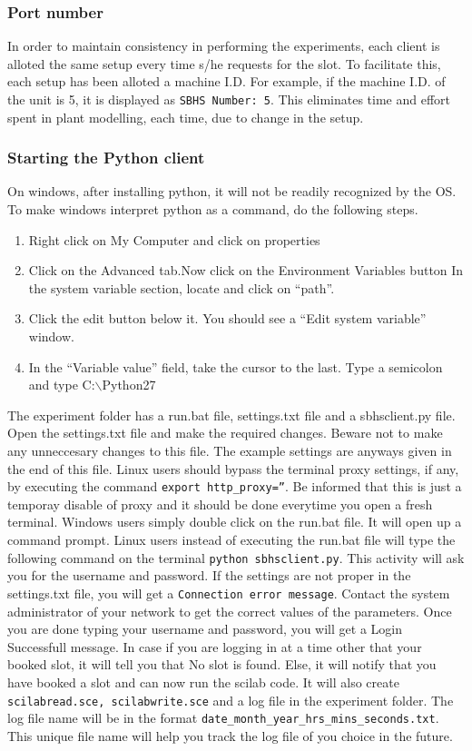 \subsubsection {Port number} In order to maintain consistency in
performing the experiments, each client is alloted the same setup
every time s/he requests for the slot. To facilitate this, each setup
has been alloted a machine I.D. For example, if the machine I.D. of
the unit is 5, it is displayed as {\tt SBHS Number: 5}. This
eliminates time and effort spent in plant modelling, each time, due to
change in the setup.

\subsubsection { Starting the Python client} On windows, after installing python, it will not be readily recognized by the OS. To make windows interpret python as a command, do the following steps.
\begin{enumerate}
\item Right click on My Computer and click on properties
\item Click on the Advanced tab.Now click on the Environment Variables button
In the system variable section, locate and click on “path”.
\item Click the edit button below it. You should see a “Edit system variable” window.
\item In the “Variable value” field, take the cursor to the last.
Type a semicolon and type C:$\backslash$Python27
\end{enumerate}
The experiment folder has a run.bat file, settings.txt file and a sbhsclient.py file. Open the settings.txt file and make the required changes. Beware not to make any unneccesary changes to this file. The example settings are anyways given in the end of this file. Linux users should bypass the terminal proxy settings, if any, by executing the command {\tt export http\_proxy=''}. Be informed that this is just a temporay disable of proxy and it should be done everytime you open a fresh terminal. Windows users simply double click on the run.bat file. It will open up a command prompt. Linux users instead of executing the run.bat file will type the following command on the terminal {\tt python sbhsclient.py}. This activity will ask you for the username and password. If the settings are not proper in the settings.txt file, you will get a {\tt Connection error message}. Contact the system administrator of your network to get the correct values of the parameters. Once you are done typing your username and password, you will get a Login Successfull message. In case if you are logging in at a time other that your booked slot, it will tell you that No slot is found. Else, it will notify that you have booked a slot and can now run the scilab code. It will also create {\tt scilabread.sce, scilabwrite.sce} and a log file in the experiment folder. The log file name will be in the format {\tt date\_month\_year\_hrs\_mins\_seconds.txt}. This unique file name will help you track the log file of you choice in the future. 
